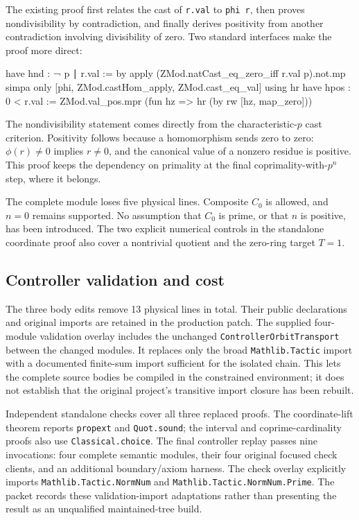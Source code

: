 \documentclass[11pt]{article}
\newcommand{\code}[1]{\nolinkurl{#1}}
\begin{document}
The existing proof first relates the cast of \code{r.val} to \code{phi r}, then proves nondivisibility by contradiction, and finally derives positivity from another contradiction involving divisibility of zero. Two standard interfaces make the proof more direct:

\begin{Lean}
  have hnd : ¬ p ∣ r.val := by
    apply (ZMod.natCast_eq_zero_iff r.val p).not.mp
    simpa only [phi, ZMod.castHom_apply, ZMod.cast_eq_val]
      using hr
  have hpos : 0 < r.val :=
    ZMod.val_pos.mpr (fun hz => hr (by rw [hz, map_zero]))
\end{Lean}

The nondivisibility statement comes directly from the characteristic-$p$ cast criterion. Positivity follows because a homomorphism sends zero to zero: $\phi(r)\ne0$ implies $r\ne0$, and the canonical value of a nonzero residue is positive. This proof keeps the dependency on primality at the final coprimality-with-$p^n$ step, where it belongs.

The complete module loses five physical lines. Composite $C_0$ is allowed, and $n=0$ remains supported. No assumption that $C_0$ is prime, or that $n$ is positive, has been introduced. The two explicit numerical controls in the standalone coordinate proof also cover a nontrivial quotient and the zero-ring target $T=1$.

\subsection*{Controller validation and cost}

The three body edits remove 13 physical lines in total. Their public declarations and original imports are retained in the production patch. The supplied four-module validation overlay includes the unchanged \code{ControllerOrbitTransport} between the changed modules. It replaces only the broad \code{Mathlib.Tactic} import with a documented finite-sum import sufficient for the isolated chain. This lets the complete source bodies be compiled in the constrained environment; it does not establish that the original project's transitive import closure has been rebuilt.

Independent standalone checks cover all three replaced proofs. The coordinate-lift theorem reports \code{propext} and \code{Quot.sound}; the interval and coprime-cardinality proofs also use \code{Classical.choice}. The final controller replay passes nine invocations: four complete semantic modules, their four original focused check clients, and an additional boundary/axiom harness. The check overlay explicitly imports \code{Mathlib.Tactic.NormNum} and \code{Mathlib.Tactic.NormNum.Prime}. The packet records these validation-import adaptations rather than presenting the result as an unqualified maintained-tree build.
\end{document}

